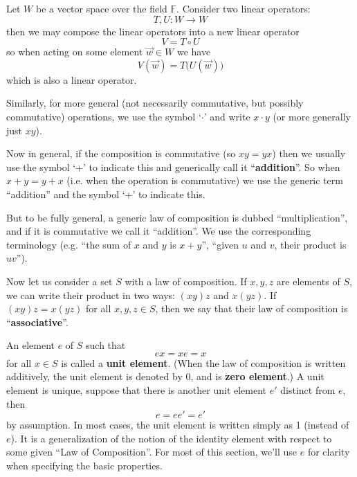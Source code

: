 \begin{ex}
Let $W$ be a vector space over the field
$\mathbb{F}$. Consider two linear operators: 
\begin{equation}
T,U:W\to W
\end{equation}
then we may compose the linear operators into a new linear
operator
\begin{equation}
V = T\circ U
\end{equation}
so when acting on some element $\vec{w}\in W$ we have
\begin{equation}
V(\vec{w}) = T\Big(U(\vec{w})\Big)
\end{equation}
which is also a linear operator. \qef
\end{ex}
Similarly, for more general (not necessarily commutative, but possibly
commutative) operations, we use the symbol `$\cdot$' and
write $x\cdot y$ (or more generally just $xy$).

Now in general, if the composition is commutative (so
$xy=yx$) then we usually use the symbol `+' to indicate this
and generically call it ``\textbf{addition}''. So when
$x+y=y+x$ (i.e. when the operation is commutative) we use
the generic term ``addition'' and the symbol `+' to indicate
this. 

But to be fully general, a generic law of composition is
dubbed ``multiplication'', and if it is commutative we call
it ``addition''. We use the corresponding terminology
(e.g. ``the sum of $x$ and $y$ is $x+y$'', ``given $u$ and
$v$, their product is $uv$'').

Now let us consider a set $S$ with a law of composition. If
$x,y,z$ are elements of $S$, we can write their product in
two ways: $(xy)z$ and $x(yz)$. If $(xy)z=x(yz)$ for all
$x,y,z\in S$, then we say that their law of composition is ``\textbf{associative}''.

An element $e$ of $S$ such that
\begin{equation}
ex = xe = x
\end{equation}
for all $x\in S$ is called a \textbf{unit element}.
(When the law of composition is written additively, the unit
element is denoted by 0, and is \textbf{zero element}.) 
A unit element is unique, suppose that there is another unit
element $e'$ distinct from $e$, then
\begin{equation}
e = ee' = e'
\end{equation}
by assumption. In most cases, the unit element is written
simply as 1 (instead of $e$). It is a generalization of the
notion of the identity element with respect to some given
``Law of Composition''. For most of this section, we'll use
$e$ for clarity when specifying the basic properties.

